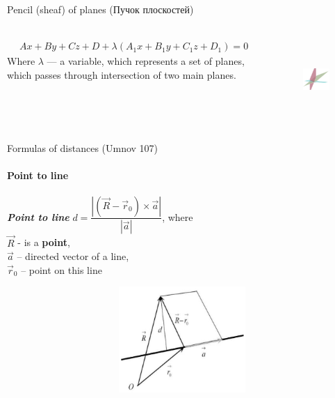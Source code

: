 \documentclass[aspectratio=169]{beamer}
\begin{document}
\begin{frame}[t]{Pencil (sheaf) of planes (Пучок плоскостей)}
\framesubtitle{}
\begin{columns}[T,onlytextwidth]
    \begin{column}{0.49\textwidth}
        \begin{align*}
            Ax+By+Cz+D+\lambda(A_1x+B_1y+C_1z+D_1)=0
        \end{align*}
        Where $\lambda$ --- a variable, which represents a set of planes, which passes through intersection of two main planes.       
    \end{column}
    \begin{column}{0.49\textwidth}
            \begin{figure}[H]
        \href{https://www.geogebra.org/calculator/zthjne4v}{
            \centering\includegraphics[height=3cm,width=1\textwidth,keepaspectratio]{pencil_of_planes.png}}
        \label{fig:pencil_of_planes.png}
    \end{figure}
    \end{column}
\end{columns}

\end{frame}


\begin{frame}[t]{Formulas of distances (Umnov 107)}
    \framesubtitle{Point to line}
    \begin{minipage}{0.6\textwidth}
        \textbf{\textit{Point to line}} $d = \dfrac{\left|(\vec{R}-\vec{r}_0) \times \vec{a}\right| }{\left|\vec{a}\right|}$, where \\ $\vec{R}$ - is a \textbf{point},\\ $\vec{a}$ -- directed vector of a line, \\ $\vec{r}_0$ -- point on this line
    \end{minipage}
    \begin{minipage}{0.39\textwidth}
        \begin{figure}[H]
            \centering\includegraphics[height=4cm,width=1\textwidth,keepaspectratio]{distance_1.png}
            \label{fig:distance_1.png}
        \end{figure}
    \end{minipage}
\end{frame}
\end{document}
